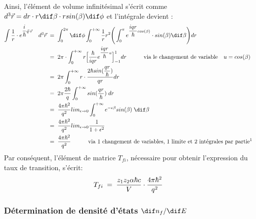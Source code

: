 Ainsi, l'élément de volume infinitésimal s'écrit comme  $d^3\vec{r} = dr \cdot r \dif\beta \cdot r sin(\beta) \dif\phi $ et l'intégrale devient :
\begin{align*}
    \int \dfrac{1}{r} \cdot e^{\dfrac{i}{\hbar}\vec{q}\cdot\vec{r}}
    \quad d^3\vec{r}
        &\eq
    \int_{0}^{2 \pi} \dif\phi
    \int_{0}^{+\infty} \dfrac{1}{r}r^2 
    \Bigg( 
        \int_{0}^{\pi}
        e^{\dfrac{iqr}{\hbar}cos(\beta)} \cdot sin(\beta) \dif\beta
    \Bigg) dr\\
        &\eq
    2 \pi \cdot \int_{0}^{+\infty} r 
    \Big[
      \dfrac{\hbar}{iqr}e^{\dfrac{iqr}{\hbar}u}
    \Big]^{1}_{-1}
    dr 
    \qquad \quad \text{via le changement de variable} \quad u = cos(\beta)\\
        &\eq
    2 \pi \int_{0}^{+\infty} r
    \cdot \dfrac{2\hbar sin(\dfrac{qr}{\hbar})}{qr} dr\\
        &\eq
    2 \pi \dfrac{2\hbar}{q} \int_{0}^{+\infty} sin(\dfrac{qr}{\hbar}) \; dr\\
        &\eq
    \dfrac{4\pi\hbar^2}{q^2} lim_{\epsilon \rightarrow 0}\int_{0}^{+\infty}e^{-\epsilon \beta} sin(\beta) \; \dif\beta\\
        &\eq
    \dfrac{4\pi\hbar^2}{q^2} lim_{\epsilon \rightarrow 0}\dfrac{1}{1 + \epsilon^2}\\
        &\eq
    \dfrac{4\pi\hbar^2}{q^2}
    \qquad \quad \text{via 1 changement de variables, 1 limite et 2 intégrales par partie\footnotemark} 
\end{align*}
Par conséquent, l'élément de matrice $T_{fi}$, nécessaire pour obtenir l'expression du taux de transition, s'écrit:
\begin{equation*}
    T_{fi} 
    \; = \; 
    \dfrac{z_1 z_2\alpha\hbar c}{V} \cdot \dfrac{4 \pi \hbar^2}{q^2}
\end{equation*}



\subsubsection{Détermination de densité d'états $\dif n_f/ \dif E$}



